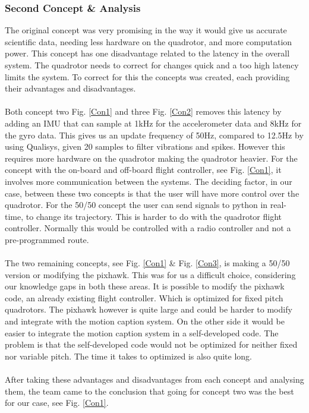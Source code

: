 \subsubsection{Second Concept \& Analysis}
The original concept was very promising in the way it would give us accurate scientific data, needing less hardware on the quadrotor, and more computation power. This concept has one disadvantage related to the latency in the overall system. The quadrotor needs to correct for changes quick and a too high latency limits the system. To correct for this the concepts was created, each providing their advantages and disadvantages. 
\\\\
Both concept two Fig. \ref{Con1} and three Fig. \ref{Con2} removes this latency by adding an IMU that can sample at 1kHz for the accelerometer data and 8kHz for the gyro data. This gives us an update frequency of 50Hz, compared to 12.5Hz by using Qualisys, given 20 samples to filter vibrations and spikes. However this requires more hardware on the quadrotor making the quadrotor heavier. For the concept with the on-board and off-board flight controller, see Fig. \ref{Con1}, it involves more communication between the systems. The deciding factor, in our case, between these two concepts is that the user will have more control over the quadrotor. For the 50/50 concept the user can send signals to python in real-time, to change its trajectory. This is harder to do with the quadrotor flight controller. Normally this would be controlled with a radio controller and not a pre-programmed route. 
\\\\
The two remaining concepts, see Fig. \ref{Con1} \& Fig. \ref{Con3}, is making a 50/50 version or modifying the pixhawk. This was for us a difficult choice, considering our knowledge gaps in both these areas. It is possible to modify the pixhawk code, an already existing flight controller. Which is optimized for fixed pitch quadrotors. The pixhawk however is quite large and could be harder to modify and integrate with the motion caption system. On the other side it would be easier to integrate the motion caption system in a self-developed code. The problem is that the self-developed code would not be optimized for neither fixed nor variable pitch. The time it takes to optimized is also quite long.
\\\\
After taking these advantages and disadvantages from each concept and analysing them, the team came to the conclusion that going for concept two was the best for our case, see Fig. \ref{Con1}. 


